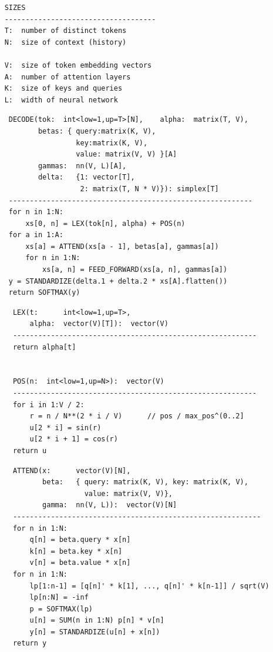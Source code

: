 \documentclass[9pt]{report}
\begin{document}
{\renewcommand{\baselinestretch}{1.1}
\footnotesize
\begin{verbatim}
    SIZES
    ------------------------------------
    T:  number of distinct tokens
    N:  size of context (history)

    V:  size of token embedding vectors
    A:  number of attention layers
    K:  size of keys and queries
    L:  width of neural network
\end{verbatim}

\clearpage
\footnotesize 
\begin{verbatim}
     DECODE(tok:  int<low=1,up=T>[N],    alpha:  matrix(T, V),
            betas: { query:matrix(K, V),
                     key:matrix(K, V),
                     value: matrix(V, V) }[A]
            gammas:  nn(V, L)[A],
            delta:   {1: vector[T],
                      2: matrix(T, N * V)}): simplex[T]
     ----------------------------------------------------------
     for n in 1:N:
         xs[0, n] = LEX(tok[n], alpha) + POS(n)
     for a in 1:A:
         xs[a] = ATTEND(xs[a - 1], betas[a], gammas[a])
         for n in 1:N:
             xs[a, n] = FEED_FORWARD(xs[a, n], gammas[a])
     y = STANDARDIZE(delta.1 + delta.2 * xs[A].flatten())
     return SOFTMAX(y)
\end{verbatim}
\normalsize

\clearpage
\footnotesize
\begin{verbatim}
      LEX(t:      int<low=1,up=T>,
          alpha:  vector(V)[T]):  vector(V)  
      ----------------------------------------------------------
      return alpha[t]


      POS(n:  int<low=1,up=N>):  vector(V)
      ----------------------------------------------------------
      for i in 1:V / 2:
          r = n / N**(2 * i / V)      // pos / max_pos^(0..2]
          u[2 * i] = sin(r)
          u[2 * i + 1] = cos(r)
      return u
\end{verbatim}

\clearpage
\footnotesize
\begin{verbatim}
      ATTEND(x:      vector(V)[N],
             beta:   { query: matrix(K, V), key: matrix(K, V),
                       value: matrix(V, V)},
             gamma:  nn(V, L)):  vector(V)[N]
      -----------------------------------------------------------
      for n in 1:N:
          q[n] = beta.query * x[n]
          k[n] = beta.key * x[n]
          v[n] = beta.value * x[n]
      for n in 1:N:
          lp[1:n-1] = [q[n]' * k[1], ..., q[n]' * k[n-1]] / sqrt(V)
          lp[n:N] = -inf                                 
          p = SOFTMAX(lp)                                
          u[n] = SUM(n in 1:N) p[n] * v[n]               
          y[n] = STANDARDIZE(u[n] + x[n])                
      return y
\end{verbatim}

}
\end{document}
